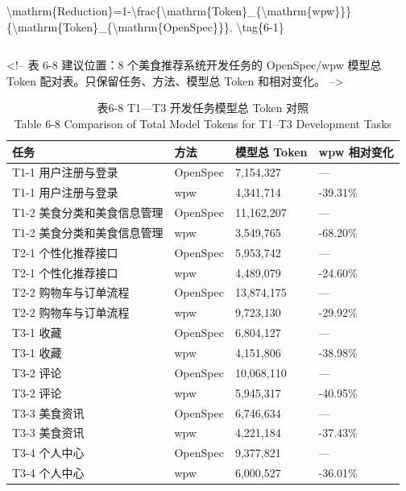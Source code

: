 \begin{equation}

\end{equation}

\textbackslash{}mathrm\{Reduction\}=1-\textbackslash{}frac\{\textbackslash{}mathrm\{Token\}\_\{\textbackslash{}mathrm\{wpw\}\}\}\{\textbackslash{}mathrm\{Token\}\_\{\textbackslash{}mathrm\{OpenSpec\}\}\}. \textbackslash{}tag\{6-1\}

\begin{equation}

\end{equation}

<!-- 表 6-8 建议位置：8 个美食推荐系统开发任务的 OpenSpec/wpw 模型总 Token 配对表。只保留任务、方法、模型总 Token 和相对变化。 -->

\begin{table}[htbp]
\centering
\small
\caption{表6-8 T1—T3 开发任务模型总 Token 对照\\Table 6-8 Comparison of Total Model Tokens for T1–T3 Development Tasks}
\begin{tabularx}{\textwidth}{|X|X|X|X|}
\hline
\textbf{任务} & \textbf{方法} & \textbf{模型总 Token} & \textbf{wpw 相对变化} \\
\hline
T1-1 用户注册与登录 & OpenSpec & 7,154,327 & — \\
T1-1 用户注册与登录 & wpw & 4,341,714 & -39.31\% \\
T1-2 美食分类和美食信息管理 & OpenSpec & 11,162,207 & — \\
T1-2 美食分类和美食信息管理 & wpw & 3,549,765 & -68.20\% \\
T2-1 个性化推荐接口 & OpenSpec & 5,953,742 & — \\
T2-1 个性化推荐接口 & wpw & 4,489,079 & -24.60\% \\
T2-2 购物车与订单流程 & OpenSpec & 13,874,175 & — \\
T2-2 购物车与订单流程 & wpw & 9,723,130 & -29.92\% \\
T3-1 收藏 & OpenSpec & 6,804,127 & — \\
T3-1 收藏 & wpw & 4,151,806 & -38.98\% \\
T3-2 评论 & OpenSpec & 10,068,110 & — \\
T3-2 评论 & wpw & 5,945,317 & -40.95\% \\
T3-3 美食资讯 & OpenSpec & 6,746,634 & — \\
T3-3 美食资讯 & wpw & 4,221,184 & -37.43\% \\
T3-4 个人中心 & OpenSpec & 9,377,821 & — \\
T3-4 个人中心 & wpw & 6,000,527 & -36.01\% \\
\hline
\end{tabularx}
\end{table}

